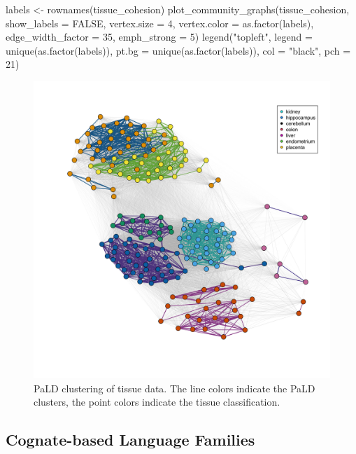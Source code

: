 \begin{Schunk}
\begin{Sinput}
labels <- rownames(tissue_cohesion)
plot_community_graphs(tissue_cohesion,
                      show_labels = FALSE,
                      vertex.size = 4,
                      vertex.color = as.factor(labels),
                      edge_width_factor = 35,
                      emph_strong = 5) 
legend("topleft", 
       legend = unique(as.factor(labels)), 
       pt.bg = unique(as.factor(labels)),
       col = "black",
       pch = 21)
\end{Sinput}
\end{Schunk}

\begin{Schunk}
\begin{figure}
\includegraphics[width=1\linewidth]{fig5} \caption[PaLD clustering of tissue data]{PaLD clustering of tissue data. The line colors indicate the PaLD clusters, the point colors indicate the tissue classification.}\label{fig:fig4}
\end{figure}
\end{Schunk}

\hypertarget{cognate-based-language-families}{%
\subsection{Cognate-based Language
Families}\label{cognate-based-language-families}}

